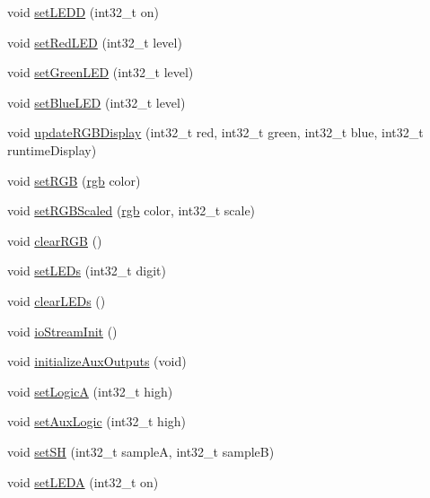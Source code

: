 \begin{DoxyCompactItemize}
void \mbox{\hyperlink{class_via_module_ad9883693e8eacafa7ee68866793adf6e}{set\+L\+E\+DD}} (int32\+\_\+t on)
\item 
void \mbox{\hyperlink{class_via_module_a7a11c19ddf0c9a04061105a65d7c546b}{set\+Red\+L\+ED}} (int32\+\_\+t level)
\item 
void \mbox{\hyperlink{class_via_module_a4ead83d6ff1a8367d28d90c7e6271438}{set\+Green\+L\+ED}} (int32\+\_\+t level)
\item 
void \mbox{\hyperlink{class_via_module_a0832ffebe3e2d4d4cca044eaca59d99e}{set\+Blue\+L\+ED}} (int32\+\_\+t level)
\item 
void \mbox{\hyperlink{class_via_module_a4e627dab33ebf9b6ac2432aceb2a154d}{update\+R\+G\+B\+Display}} (int32\+\_\+t red, int32\+\_\+t green, int32\+\_\+t blue, int32\+\_\+t runtime\+Display)
\item 
void \mbox{\hyperlink{class_via_module_a9be28b96909b71625da532d5853c9ed4}{set\+R\+GB}} (\mbox{\hyperlink{structrgb}{rgb}} color)
\item 
void \mbox{\hyperlink{class_via_module_a284349df4c0e5b7153a5b82984fe9aee}{set\+R\+G\+B\+Scaled}} (\mbox{\hyperlink{structrgb}{rgb}} color, int32\+\_\+t scale)
\item 
void \mbox{\hyperlink{class_via_module_ab36185cb09e40578d0f0edb4ec74b7d3}{clear\+R\+GB}} ()
\item 
void \mbox{\hyperlink{class_via_module_a3acb105a42d49655361086d731d8e29d}{set\+L\+E\+Ds}} (int32\+\_\+t digit)
\item 
void \mbox{\hyperlink{class_via_module_ab690d8abdb4a3332db267d8d6a505bc7}{clear\+L\+E\+Ds}} ()
\item 
void \mbox{\hyperlink{class_via_module_a828697a5278c926373fe8f49114e0503}{io\+Stream\+Init}} ()
\item 
void \mbox{\hyperlink{class_via_module_a920be7d9a70222fde0fda7d807538272}{initialize\+Aux\+Outputs}} (void)
\item 
void \mbox{\hyperlink{class_via_module_a9add4c62e49aef8e8a122c923e31edc7}{set\+LogicA}} (int32\+\_\+t high)
\item 
void \mbox{\hyperlink{class_via_module_a6d68fc57d798138024c4e2079cbab3f3}{set\+Aux\+Logic}} (int32\+\_\+t high)
\item 
void \mbox{\hyperlink{class_via_module_a0f04112b4dde7164b36fa8916e4ae054}{set\+SH}} (int32\+\_\+t sampleA, int32\+\_\+t sampleB)
\item 
void \mbox{\hyperlink{class_via_module_a1ee37348829a21c99dd924361246a16a}{set\+L\+E\+DA}} (int32\+\_\+t on)
\item 

\end{DoxyCompactItemize}
